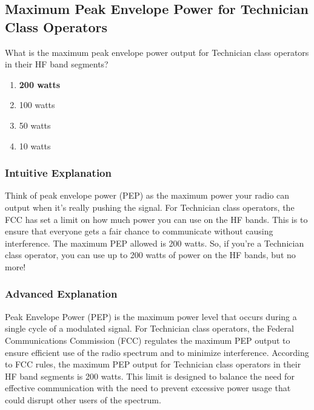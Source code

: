 \subsection{Maximum Peak Envelope Power for Technician Class Operators}
\label{T1B11}

\begin{tcolorbox}[colback=gray!10!white,colframe=black!75!black,title=T1B11]
What is the maximum peak envelope power output for Technician class operators in their HF band segments?
\begin{enumerate}[label=\Alph*),noitemsep]
    \item \textbf{200 watts}
    \item 100 watts
    \item 50 watts
    \item 10 watts
\end{enumerate}
\end{tcolorbox}

\subsubsection*{Intuitive Explanation}
Think of peak envelope power (PEP) as the maximum power your radio can output when it's really pushing the signal. For Technician class operators, the FCC has set a limit on how much power you can use on the HF bands. This is to ensure that everyone gets a fair chance to communicate without causing interference. The maximum PEP allowed is 200 watts. So, if you're a Technician class operator, you can use up to 200 watts of power on the HF bands, but no more!

\subsubsection*{Advanced Explanation}
Peak Envelope Power (PEP) is the maximum power level that occurs during a single cycle of a modulated signal. For Technician class operators, the Federal Communications Commission (FCC) regulates the maximum PEP output to ensure efficient use of the radio spectrum and to minimize interference. According to FCC rules, the maximum PEP output for Technician class operators in their HF band segments is 200 watts. This limit is designed to balance the need for effective communication with the need to prevent excessive power usage that could disrupt other users of the spectrum.